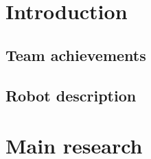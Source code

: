 \section{Introduction}



%
\subsection{Team achievements}



%
\subsection{Robot description}


%
\section{Main research}



